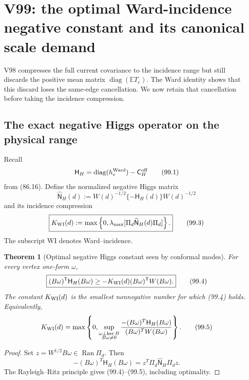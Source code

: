 \documentclass[11pt]{article}
\newtheorem{theorem}{Theorem}[section]
\theoremstyle{remark}
\begin{document}
\section{V99: the optimal Ward-incidence negative constant and its canonical scale demand}
\label{sec:v17v99}

V98 compresses the full current covariance to the incidence range but
still discards the positive mean matrix
\(\operatorname{diag}(\mathbb ET_e)\).  The Ward identity shows that
this discard loses the same-edge cancellation.  We now retain that
cancellation before taking the incidence compression.

\subsection{The exact negative Higgs operator on the physical range}

Recall
\[
 \mathsf H_H
 =\operatorname{diag}(h_e^{\rm Ward})
  -\mathsf C_H^{\rm off}                             \tag{99.1}
\]
from (86.16).  Define the normalized negative Higgs matrix
\[
 \widehat{\mathsf N}_H(d)
 :=W(d)^{-1/2}\{-\mathsf H_H(d)\}W(d)^{-1/2}         \tag{99.2}
\]
and its incidence compression
\[
\boxed{
 K_{\rm WI}(d)
 :=\max\left\{0,
 \lambda_{\max}
 [\Pi_d\widehat{\mathsf N}_H(d)\Pi_d]
 \right\}.}                                        \tag{99.3}
\]
The subscript WI denotes Ward--incidence.

\begin{theorem}[Optimal negative Higgs constant seen by conformal modes]
\label{thm:v17v99-optimal}
For every vertex one-form \(\omega\),
\[
\boxed{
 (B\omega)^{\mathsf T}\mathsf H_H(B\omega)
 \geq-K_{\rm WI}(d)
       (B\omega)^{\mathsf T}W(B\omega).}            \tag{99.4}
\]
The constant \(K_{\rm WI}(d)\) is the smallest nonnegative number for
which (99.4) holds.  Equivalently,
\[
 K_{\rm WI}(d)
 =\max\left\{0,
 \sup_{\substack{\omega\perp\ker B\\B\omega\ne0}}
 \frac{-(B\omega)^T\mathsf H_H(B\omega)}
      {(B\omega)^TW(B\omega)}\right\}.              \tag{99.5}
\]
\end{theorem}

\begin{proof}
Set \(z=W^{1/2}B\omega\in\operatorname{Ran}\Pi_d\).  Then
\[
 -(B\omega)^T\mathsf H_H(B\omega)
 =z^T\Pi_d\widehat{\mathsf N}_H\Pi_dz.             \tag{99.6}
\]
The Rayleigh--Ritz principle gives (99.4)--(99.5), including
optimality.
\end{proof}
\end{document}
